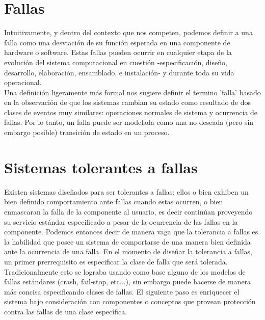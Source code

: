 \documentclass[titlepage, 12pt]{book}
\begin{document}
\section{Fallas}
Intuitivamente, y dentro del contexto que nos competen, podemos definir a una falla como una desviaci\'on de su funci\'on esperada en una componente de hardware o software. Estas fallas pueden ocurrir en cualquier etapa de la evoluci\'on del sistema computacional en cuesti\'on -especificaci\'on, dise\~no, desarrollo, elaboraci\'on, ensamblado, e instalaci\'on- y durante toda su vida operacional\cite{FaultInject}.\\

Una definici\'on ligeramente m\'as formal nos sugiere definir el termino 'falla' basado en la observaci\'on de que los sistemas cambian su estado como resultado de dos clases de eventos muy similares: operaciones normales de sistema y ocurrencia de fallas. Por lo tanto, un falla puede ser modelada como una no deseada (pero sin embargo posible) transici\'on de estado en un proceso\cite{Felix}.






\section{Sistemas tolerantes a fallas}
Existen sistemas dise\~nados para ser tolerantes a fallas: ellos o bien exhiben un bien definido comportamiento ante fallas cuando estas ocurren, o bien enmascaran la falla de la componente al usuario, es decir contin\'uan proveyendo su servicio est\'andar especificado a pesar de la ocurrencia de las fallas en la componente\cite{Cristian}.
Podemos entonces decir de manera vaga que la tolerancia a fallas es la habilidad que posee un sistema de comportarse de una manera bien definida ante la ocurrencia de una falla. En el momento de dise\~nar la tolerancia a fallas, un primer prerrequisito es especificar la clase de falla que ser\'a tolerada. Tradicionalmente esto se lograba usando como base alguno de los modelos de fallas est\'andares (crash, fail-stop, etc...), sin embargo puede hacerse de manera m\'as concisa especificando clases de fallas. El siguiente paso es enriquecer el sistema bajo consideraci\'on con componentes o conceptos que provean protecci\'on contra las fallas de una clase espec\'ifica\cite{FaultInject}.\\
\end{document}
